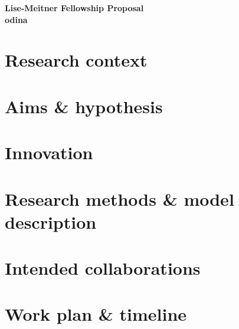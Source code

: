 \documentclass[11pt, a4paper, oneside, article]{memoir}
\begin{document}
\setlength{\baselineskip}{15pt}         %



\begin{center}
   \vspace*{-0.5\baselineskip}
    \huge
    \textbf{Lise-Meitner Fellowship Proposal}\\
    \vspace{0.5\baselineskip}
    \LARGE   
    \textbf{\gls{odina}}
    \glsresetall
    \normalsize
    \tableofcontents*
\end{center}

\chapter{Research context}
\label{c:context}


\chapter{Aims \& hypothesis}
\label{c:aim_hyp}


\chapter{Innovation}
\label{c:innovation}


\vspace{-0.5\baselineskip}
\chapter{Research methods \& model description}
\label{c:methods}


\newpage
\chapter{Intended collaborations}
\label{c:collab}


\vspace{-.5\baselineskip}
\chapter{Work plan \& timeline}
\label{c:project_plan}

\end{document}
